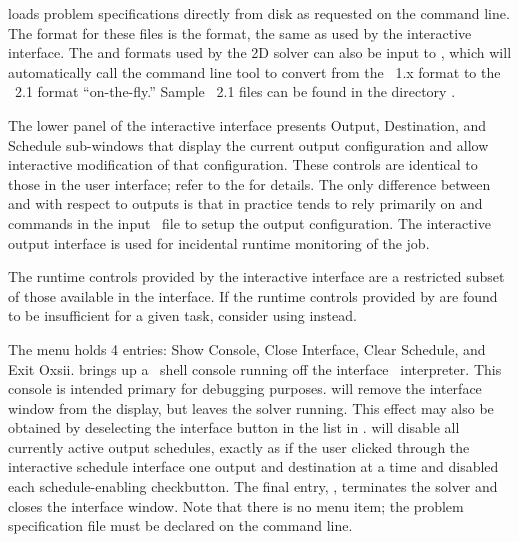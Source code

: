  loads problem specifications directly from disk as
requested on the command line.  The format for these files is
the  format,
the same as used by the  interactive interface.  The
 and
formats used by the
2D solver  can also be input
to , which will automatically call the command line tool
 to convert from the \MIF~1.x format to the
\MIF~2.1 format ``on-the-fly.''  Sample \MIF~2.1 files can be found in
the directory .

The lower panel of the  interactive interface presents
Output, Destination, and Schedule sub-windows that display the current
output configuration and allow interactive modification of that
configuration.  These controls are identical to those in the 
user interface; refer to the
 for details.
The only difference between  and  with
respect to outputs is that in practice  tends to rely
primarily on
 and
 commands in the input
\MIF\ file
to setup the output configuration.  The interactive output interface is
used for incidental runtime monitoring of the job.

The runtime controls provided by the  interactive interface
are a restricted subset of those available in the  interface.
If the runtime controls provided by  are found to be
insufficient for a given task, consider using  instead.

The  menu holds 4 entries: Show Console, Close
Interface, Clear Schedule, and Exit Oxsii.  
brings up a
\Tcl\ shell console running off the  interface \Tcl\
interpreter.  This console is intended primary for debugging purposes.
\btn{File\pipe Close Interface} will remove the interface window from
the display, but leaves the solver running.  This effect may also be
obtained by deselecting the
 interface button in the  list in
.
 will disable all currently active
output schedules, exactly as if the user clicked through the interactive
schedule interface one output and destination at a time and disabled
each schedule-enabling checkbutton.
The final entry,
, terminates the  solver and closes the
interface window.  Note that there is no \btn{File\pipe Load\ldots}
menu item; the problem specification file must be declared on the
\app{Boxsi} command line.

